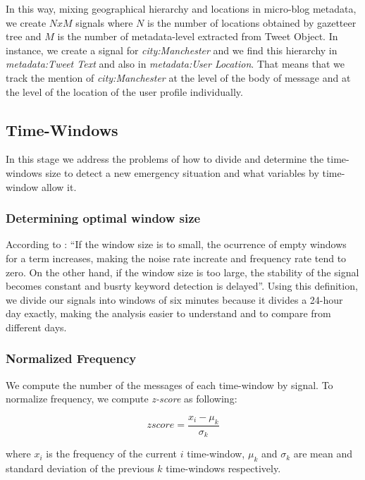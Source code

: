 \documentclass[sigconf]{acmart}
\begin{document}
In this way, mixing geographical hierarchy and locations in micro-blog metadata, we create $NxM$ signals where $N$ is the number of locations obtained by gazetteer tree and $M$ is the number of metadata-level extracted from Tweet Object. In instance, we create a signal for \textit{city:Manchester} and we find this hierarchy in \textit{metadata:Tweet Text} and also in \textit{metadata:User Location}. That means that we track the mention of \textit{city:Manchester} at the level of the body of message and at the level of the location of the user profile individually.

\subsection{Time-Windows}
In this stage we address the problems of how to divide and determine the time-windows size to detect a new emergency situation and what variables by time-window allow it.

\subsubsection{Determining optimal window size}

According to \cite{guzman2013line}: ``If the window size is to small, the ocurrence of empty windows for a term increases, making the noise rate increate and frequency rate tend to zero. On the other hand, if the window size is too large, the stability of the signal becomes constant and busrty keyword detection is delayed''. Using this definition, we divide our signals into windows of six minutes because it divides a 24-hour day exactly, making the analysis easier to understand and to compare from different days.


\subsubsection{Normalized Frequency}
We compute the number of the messages of each time-window by signal. To normalize frequency, we compute \textit{z-score} as following:

\begin{equation} \label{eq:1}
zscore = \frac{x_{i} - \mu_{k} }{\sigma_{k}}
\end{equation}

where $x_{i}$ is the frequency of the current $i$ time-window, $\mu_{k}$ and  $\sigma_{k}$ are mean and standard deviation of the previous $k$ time-windows respectively.
\end{document}
